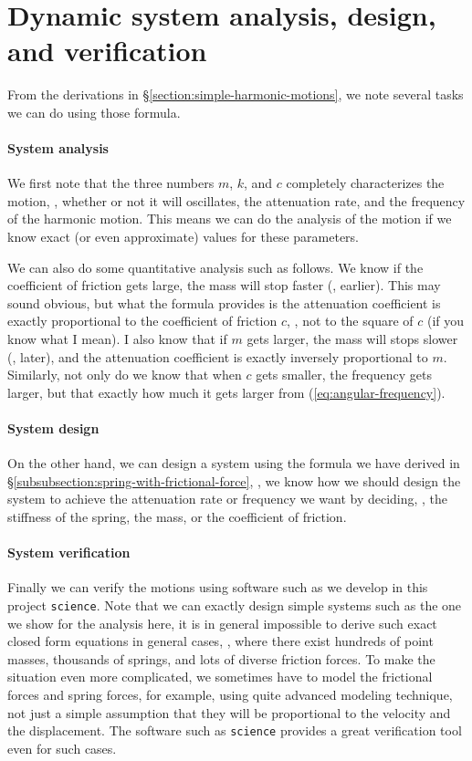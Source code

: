 \documentclass{article}
\begin{document}
\section{Dynamic system analysis, design, and verification}

From the derivations in \S\ref{section:simple-harmonic-motions},
we note several tasks we can do using those formula.

\paragraph{System analysis}

We first note that the three numbers $m$, $k$, and $c$
completely characterizes the motion,
\eg,
whether or not it will oscillates,
the attenuation rate,
and the frequency of the harmonic motion.
This means we can do the analysis of the motion
if we know exact (or even approximate) values for these parameters.

We can also do some quantitative analysis such as follows.
We know if the coefficient of friction gets large,
the mass will stop faster (\ie, earlier).
This may sound obvious,
but what the formula provides is the attenuation coefficient is exactly proportional to the coefficient of friction $c$,
\eg,
not to the square of $c$ (if you know what I mean).
I also know that if $m$ gets larger,
the mass will stops slower (\ie, later),
and the attenuation coefficient is exactly inversely proportional to $m$.
Similarly,
not only do we know that when $c$ gets smaller, the frequency gets larger,
but that exactly how much it gets larger from (\ref{eq:angular-frequency}).

\paragraph{System design}

On the other hand,
we can design a system
using the formula we have derived in \S\ref{subsubsection:spring-with-frictional-force},
\ie,
we know how we should design the system to achieve the attenuation rate or frequency we want
by deciding,
\eg,
the stiffness of the spring,
the mass,
or the coefficient of friction.

\paragraph{System verification}

Finally we can verify the motions using software such as we develop in this project {\tt science}.
Note that we can exactly design simple systems such as the one we show for the analysis here,
it is in general impossible to derive such exact closed form equations
in general cases,
\eg, where there exist hundreds of point masses, thousands of springs, and lots of diverse friction forces.
To make the situation even more complicated,
we sometimes have to model the frictional forces and spring forces, for example,
using quite advanced modeling technique, not just a simple assumption that they will be proportional to the velocity and the displacement.
The software such as {\tt science} provides a great verification tool even for such cases.
\end{document}
